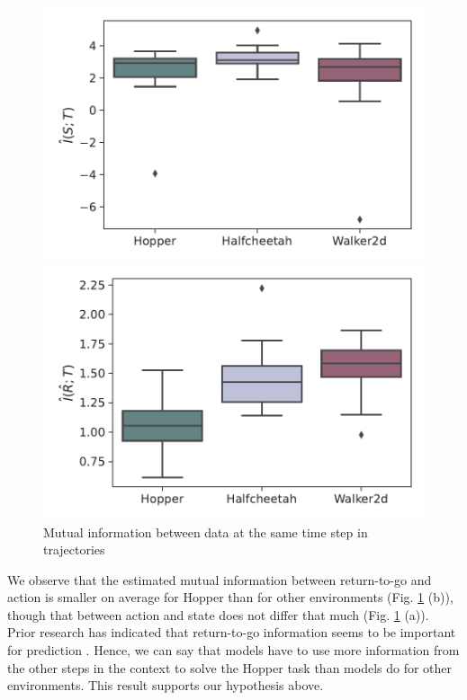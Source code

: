 \documentclass{article}
\begin{document}
\begin{figure}[h]
    \centering
    \begin{minipage}[b]{0.48\linewidth}
        \includegraphics[width=\linewidth]{figs/mi_data_state_action_medium_666.pdf}
    \end{minipage}
    \begin{minipage}[b]{0.48\linewidth}
        \includegraphics[width=\linewidth]{figs/mi_data_rtg_action_medium_666.pdf}
    \end{minipage}
    \caption{Mutual information between data at the same time step in trajectories}
    \label{fig:mutual-information-data}
\end{figure}

We observe that the estimated mutual information between return-to-go and action is smaller on average for Hopper than for other environments (Fig. \ref{fig:mutual-information-data} (b)), though that between action and state does not differ that much (Fig. \ref{fig:mutual-information-data} (a)). Prior research has indicated that return-to-go information seems to be important for prediction \cite{reid2022can}. Hence, we can say that models have to use more information from the other steps in the context to solve the Hopper task than models do for other environments. This result supports our hypothesis above.
\end{document}
